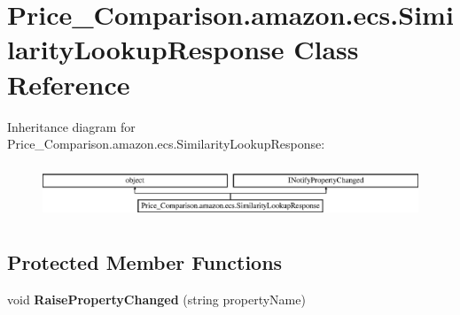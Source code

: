 \hypertarget{class_price___comparison_1_1amazon_1_1ecs_1_1_similarity_lookup_response}{\section{Price\-\_\-\-Comparison.\-amazon.\-ecs.\-Similarity\-Lookup\-Response Class Reference}
\label{class_price___comparison_1_1amazon_1_1ecs_1_1_similarity_lookup_response}
}


 


Inheritance diagram for Price\-\_\-\-Comparison.\-amazon.\-ecs.\-Similarity\-Lookup\-Response\-:\begin{figure}[H]
\begin{center}
\leavevmode
\includegraphics[height=1.618497cm]{class_price___comparison_1_1amazon_1_1ecs_1_1_similarity_lookup_response}
\end{center}
\end{figure}
\subsection*{Protected Member Functions}
\begin{DoxyCompactItemize}
\item 
\hypertarget{class_price___comparison_1_1amazon_1_1ecs_1_1_similarity_lookup_response_ada674e123e9e74ab19f1794bb714fe27}{void {\bfseries Raise\-Property\-Changed} (string property\-Name)}\label{class_price___comparison_1_1amazon_1_1ecs_1_1_similarity_lookup_response_ada674e123e9e74ab19f1794bb714fe27}

\end{DoxyCompactItemize}
